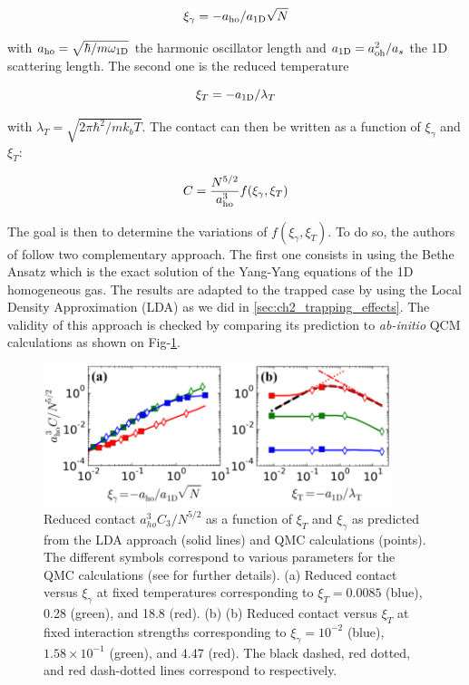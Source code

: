 \begin{equation}
    \xi_{\gamma}=-a_{\rm{ho}}/a_{\rm{1D}}\sqrt{N}
\end{equation}

\noindent with $a_{\rm{ho}}=\sqrt{\hbar/m \omega_{\rm{1D}}}$ the harmonic oscillator length and $a_{\rm{1D}}=a_{\rm{oh}}^2/a_s$ the 1D scattering length. The second one is the reduced temperature

\begin{equation}
    \xi_T=-a_{\rm{1D}}/\lambda_T
\end{equation}

\noindent with $\lambda_T=\sqrt{2\pi \hbar^2/m k_b T}$. The contact can then be written as a function of $\xi_{\gamma}$ and $\xi_{T}$:

\begin{equation}
    C= \frac{N^{5/2}}{a_{\rm{ho}}^3} f(\xi_{\gamma},\xi_{T})
\end{equation}

The goal is then to determine the variations of $f(\xi_{\gamma},\xi_{T})$. To do so, the authors of \cite{yao2018tan} follow two complementary approach. The first one consists in using the Bethe Ansatz which is the exact solution of the Yang-Yang equations \cite{yang1969thermodynamics} of the 1D homogeneous gas. The results are adapted to the trapped case by using the Local Density Approximation (LDA) as we did in \ref{sec:ch2_trapping_effects}. The validity of this approach is checked by comparing its prediction to {\it ab-initio} QCM calculations as shown on Fig-\ref{fig:C_theo}.

\begin{figure}
    \centering
    \includegraphics[width=0.9\textwidth]{Fig/Chapter5/BS_LDA_vs_Bethe.PNG}
    \caption{Reduced contact $a_{ho}^3 C_3 / N^{5/2}$ as a function of $\xi_T$ and $\xi_{\gamma}$ as predicted from the LDA approach (solid lines) and QMC calculations (points). The different symbols correspond to various parameters for the QMC calculations (see \cite{yao2018tan} for further details). (a) Reduced contact versus $\xi_{\gamma}$ at fixed temperatures corresponding to $\xi_T = 0.0085$ (blue), 0.28 (green), and 18.8 (red). (b) (b) Reduced contact versus $\xi_T$  at fixed interaction strengths corresponding to $\xi_\gamma = 10^{-2}$ (blue), $1.58 \times 10^{-1}$ (green), and 4.47 (red). The black dashed, red dotted, and red dash-dotted lines correspond to  respectively. }
    \label{fig:C_theo}
\end{figure}

